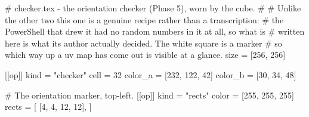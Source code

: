 # checker.tex - the orientation checker (Phase 5), worn by the cube.
#
# Unlike the other two this one is a genuine recipe rather than a transcription:
# the PowerShell that drew it had no random numbers in it at all, so what is
# written here is what its author actually decided. The white square is a marker
# so which way up a uv map has come out is visible at a glance.
size = [256, 256]

[[op]]
kind = "checker"
cell = 32
color_a = [232, 122, 42]
color_b = [30, 34, 48]

# The orientation marker, top-left.
[[op]]
kind = "rects"
color = [255, 255, 255]
rects = [
  [4, 4, 12, 12],
]
